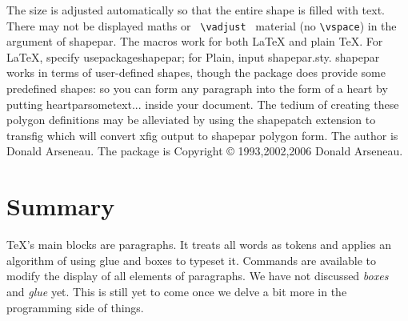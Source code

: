 {The size is adjusted automatically so that the entire shape is filled with text. There may not be displayed maths or \verb+ \vadjust +  material (no \verb+\vspace+) in the argument of shapepar. The macros work for both LaTeX and plain TeX. For LaTeX, specify usepackage{shapepar}; for Plain, input shapepar.sty.
shapepar works in terms of user-defined shapes, though the package does provide some predefined shapes: so you can form any paragraph into the form of a heart by putting heartpar{sometext...} inside your document. The tedium of creating these polygon definitions may be alleviated by using the shapepatch extension to transfig which will convert xfig output to shapepar polygon form.
The author is Donald Arseneau. The package is Copyright  © 1993,2002,2006 Donald Arseneau.


\newcommand{\abc}{abcdefghijklmnopqrstuvwxyz}


\section{Summary}
TeX's main blocks are paragraphs. It treats all words as tokens and applies an algorithm of using glue and boxes to typeset it. Commands are available  to modify the display of all elements of paragraphs. We have not discussed {\em boxes} and {\em glue} yet. This is still yet to come once we delve a bit more in the programming side of things.

}
